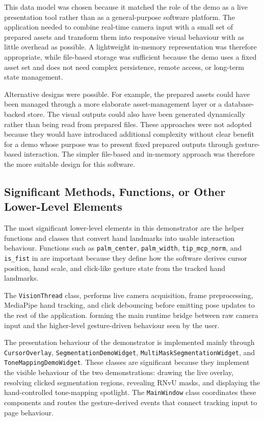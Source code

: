 ﻿\documentclass[11pt,a4paper]{article}
\begin{document}
\medskip

This data model was chosen because it matched the role of the demo as a
live presentation tool rather than as a general-purpose software platform. The
application needed to combine real-time camera input with a small set of
prepared assets and transform them into responsive visual behaviour with as
little overhead as possible. A lightweight in-memory representation was
therefore appropriate, while file-based storage was sufficient because the demo
uses a fixed asset set and does not need complex persistence, remote access, or
long-term state management.

\medskip

Alternative designs were possible. For example, the prepared assets could have
been managed through a more elaborate asset-management layer or a database-backed
store. The visual outputs could also have been generated dynamically
rather than being read from prepared files. These approaches were not adopted
because they would have introduced additional complexity without clear benefit
for a demo whose purpose was to present fixed prepared
outputs through gesture-based interaction. The simpler file-based and
in-memory approach was therefore the more suitable design for this software.


\subsection{Significant Methods, Functions, or Other Lower-Level Elements}

The most significant lower-level elements in this demonstrator are the helper
functions and classes that convert hand landmarks into usable interaction
behaviour. Functions such as \texttt{palm\_center}, \texttt{palm\_width},
\texttt{tip\_mcp\_norm}, and \texttt{is\_fist} in
 are important because they define how the
software derives cursor position, hand scale, and click-like gesture state
from the tracked hand landmarks.

\medskip

The \texttt{VisionThread} class,
performs live camera acquisition, frame preprocessing, MediaPipe hand
tracking, and click debouncing before emitting pose updates to the rest of the
application. forming the main runtime bridge
between raw camera input and the higher-level gesture-driven behaviour seen by
the user.

\medskip

The presentation behaviour of the demonstrator is implemented mainly through
\texttt{CursorOverlay}, \texttt{SegmentationDemoWidget},
\texttt{MultiMaskSegmentationWidget}, and \texttt{ToneMappingDemoWidget}.
These classes are significant because they implement the visible behaviour of
the two demonstrations: drawing the live overlay, resolving clicked
segmentation regions, revealing RNvU masks, and displaying the hand-controlled
tone-mapping spotlight. The \texttt{MainWindow} class coordinates these components and routes the
gesture-derived events that connect tracking input to page behaviour.
\end{document}
